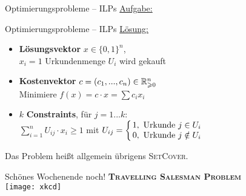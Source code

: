 \begin{frame}{Optimierungsprobleme – ILPs}
	\underline{Aufgabe: } \\
	{\scriptsize }
\end{frame}

\begin{frame}{Optimierungsprobleme – ILPs}
	\underline{Lösung: } 
	\begin{itemize}
		\item \textbf{Lösungsvektor} $x \in \{0, 1\}^n$, \\ 
		\quad $x_i = 1$ \gdw Urkundenmenge $U_i$ wird gekauft 
		\item \textbf{Kostenvektor} $c = (c_1, ..., c_n) \in \mathbb{R}_{\geqslant0}^n$ \\
		\quad Minimiere $f(x) = c \cdot x = \sum c_i x_i$
		\item $k$ \textbf{Constraints}, \quad für $j = 1...k$: \\
		\quad $\sum\limits_{i=1}^{n} U_{ij} \cdot x_i  \geq 1$ \quad mit $U_{ij} = \casesl{1, \ \text{Urkunde } j \in U_i \\ 0, \ \text{Urkunde } j \notin U_i}$
	\end{itemize}
	Das Problem heißt allgemein übrigens \textsc{SetCover}.
\end{frame}

\begin{frame}{Schönes Wochenende noch! \smiley}
	\centering
	\textbf{\textsc{Travelling Salesman Problem}} \\[.2\baselineskip]
	\texttt{[image: xkcd]}
\end{frame}

